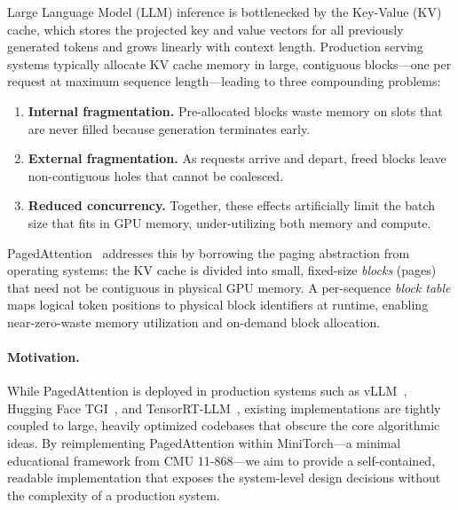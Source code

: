 \documentclass{article}
\begin{document}
Large Language Model (LLM) inference is bottlenecked by the Key-Value (KV) cache, which stores the projected key and value vectors for all previously generated tokens and grows linearly with context length.
Production serving systems typically allocate KV cache memory in large, contiguous blocks---one per request at maximum sequence length---leading to three compounding problems:
\begin{enumerate}
    \item \textbf{Internal fragmentation.} Pre-allocated blocks waste memory on slots that are never filled because generation terminates early.
    \item \textbf{External fragmentation.} As requests arrive and depart, freed blocks leave non-contiguous holes that cannot be coalesced.
    \item \textbf{Reduced concurrency.} Together, these effects artificially limit the batch size that fits in GPU memory, under-utilizing both memory and compute.
\end{enumerate}

PagedAttention~\cite{kwon2023efficient} addresses this by borrowing the paging abstraction from operating systems: the KV cache is divided into small, fixed-size \emph{blocks} (pages) that need not be contiguous in physical GPU memory.
A per-sequence \emph{block table} maps logical token positions to physical block identifiers at runtime, enabling near-zero-waste memory utilization and on-demand block allocation.

\paragraph{Motivation.}
While PagedAttention is deployed in production systems such as vLLM~\cite{kwon2023efficient}, Hugging Face TGI~\cite{huggingface2023tgi}, and TensorRT-LLM~\cite{tensorrtllm2024}, existing implementations are tightly coupled to large, heavily optimized codebases that obscure the core algorithmic ideas.
By reimplementing PagedAttention within MiniTorch---a minimal educational framework from CMU 11-868---we aim to provide a self-contained, readable implementation that exposes the system-level design decisions without the complexity of a production system.
\end{document}
